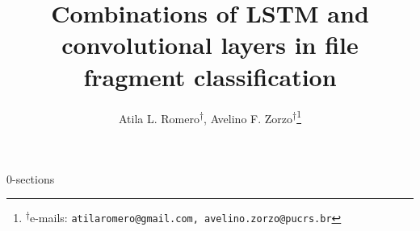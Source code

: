 \documentclass[english,oneside]{article}
\author{Atila L. Romero\textsuperscript{$\dagger$}, Avelino F. Zorzo\textsuperscript{$\dagger$}{\let\thefootnote\relax\footnote{{\textsuperscript{$\dagger$}e-mails: \texttt{atilaromero@gmail.com, avelino.zorzo@pucrs.br}}}}}
\title{Combinations of LSTM and convolutional layers in file fragment classification}
\date{}
\begin{document}
\maketitle




{0-sections}

% 
%


\end{document}
